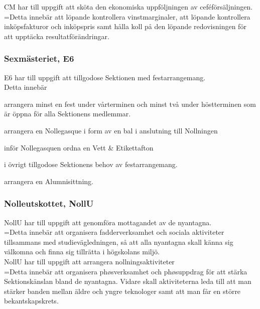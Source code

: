\documentclass[10pt]{article}
\begin{document}
\noindent CM har till uppgift att sköta den ekonomiska uppföljningen av
ceféförsäljningen. \\

\hangindent=\parindent Detta innebär att löpande kontrollera vinstmarginaler,
att löpande kontrollera inköpsfakturor och inköpspris samt hålla koll på den
löpande redovisningen för att upptäcka resultatförändringar.

\subsubsection{Sexmästeriet, E6}

E6 har till uppgift att tillgodose Sektionen med festarrangemang.\\

Detta innebär
\begin{attlist}
    \item arrangera minst en fest under vårterminen och minst två under
        höstterminen som är öppna för alla Sektionens medlemmar.
    \item arrangera en Nollegasque i form av en bal i anslutning till
        Nollningen
    \item inför Nollegasquen ordna en Vett \& Etikettafton
    \item i övrigt tillgodose Sektionens behov av festarrangemang.
    \item arrangera en Alumnisittning.
\end{attlist}
\subsubsection{Nolleutskottet, NollU}

NollU har till uppgift att genomföra mottagandet av de nyantagna.\\

\hangindent=\parindent Detta innebär att organisera fadderverksamhet och
sociala aktiviteter tillsammans med studievägledningen, så att alla nyantagna
skall känna sig välkomna och finna sig tillrätta i högskolans miljö. \\

\noindent NollU har till uppgift att arrangera nollningsaktiviteter\\

\hangindent=\parindent Detta innebär att organisera phøsverksamhet och
phøsuppdrag för att stärka Sektionskänslan bland de nyantagna. Vidare
skall aktiviteterna leda till att man stärker banden mellan äldre och yngre
teknologer samt att man får en större bekantskapskrets. \\
\end{document}
